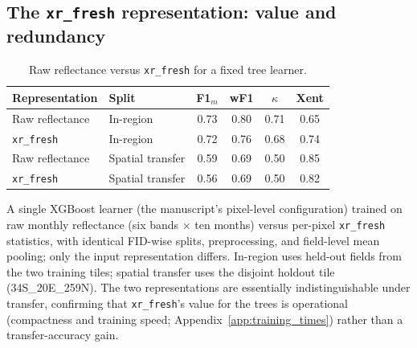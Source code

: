 \documentclass[pdflatex,sn-mathphys]{sn-jnl} %
\begin{document}
\subsection{The \texttt{xr\_fresh} representation: value and redundancy}
\label{subsec:featdim}

\begin{table}[t]
\centering
\caption{Raw reflectance versus \texttt{xr\_fresh} for a fixed tree learner.}
\label{tab:repr}
\renewcommand{\arraystretch}{1.1}
\setlength{\tabcolsep}{6pt}
\begin{tabular}{llcccc}
\toprule
\textbf{Representation} & \textbf{Split} & \textbf{F1$_m$} & \textbf{wF1} & \textbf{$\kappa$} & \textbf{Xent} \\
\midrule
Raw reflectance    & In-region        & 0.73 & 0.80 & 0.71 & 0.65 \\
\texttt{xr\_fresh} & In-region        & 0.72 & 0.76 & 0.68 & 0.74 \\
\midrule
Raw reflectance    & Spatial transfer & 0.59 & 0.69 & 0.50 & 0.85 \\
\texttt{xr\_fresh} & Spatial transfer & 0.56 & 0.69 & 0.50 & 0.82 \\
\bottomrule
\end{tabular}
\par\vspace{4pt}
{\footnotesize A single XGBoost learner (the manuscript's pixel-level configuration)
trained on raw monthly reflectance (six bands $\times$ ten months) versus per-pixel
\texttt{xr\_fresh} statistics, with identical FID-wise splits, preprocessing, and
field-level mean pooling; only the input representation differs. In-region uses held-out
fields from the two training tiles; spatial transfer uses the disjoint holdout tile
(34S\_20E\_259N). The two representations are essentially indistinguishable under transfer,
confirming that \texttt{xr\_fresh}'s value for the trees is operational (compactness and
training speed; Appendix~\ref{app:training_times}) rather than a transfer-accuracy gain.\par}
\end{table}
\end{document}
